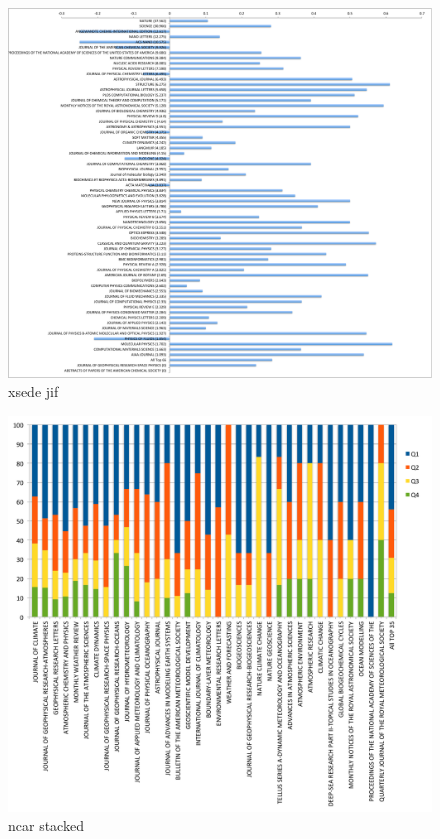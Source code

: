 \documentclass{sig-alternate}
\begin{document}
\begin{figure}[htb] 
  \centering 
    \includegraphics[width=1.0\textwidth]{images-new/xsede-journal-bar-by-jif.pdf} 
  \caption{xsede jif}\label{F:xsede-jif} 
\end{figure} 

\begin{figure}[htb] 
  \centering 
    \includegraphics[width=1.0\textwidth]{images-new/ncar-journal-stacked-rank-by-pubs.pdf} 
  \caption{ncar stacked}\label{F:ncar-stacked} 
\end{figure} 
\end{document}
